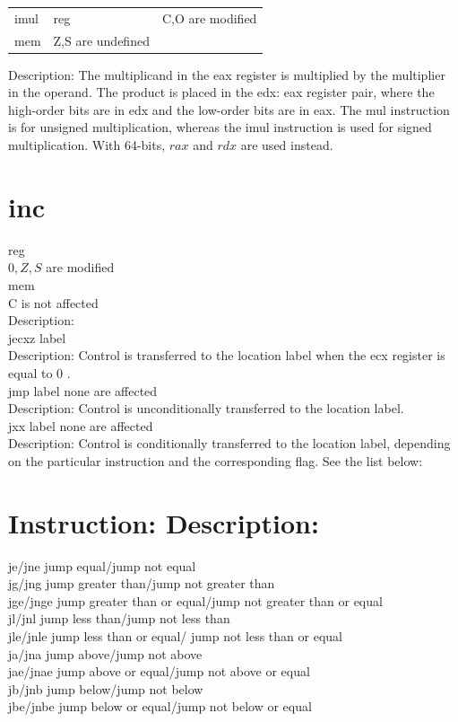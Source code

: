 \documentclass[10pt]{article}
\begin{document}
\begin{center}
\begin{tabular}{lll}
imul & reg & C,O are modified \\
mem & Z,S are undefined &  \\
\end{tabular}
\end{center}

Description: The multiplicand in the eax register is multiplied by the multiplier in the operand. The product is placed in the edx: eax register pair, where the high-order bits are in edx and the low-order bits are in eax. The mul instruction is for unsigned multiplication, whereas the imul instruction is used for signed multiplication. With 64-bits, $r a x$ and $r d x$ are used instead.

\section*{inc}
reg\\
$0, Z, S$ are modified\\
mem\\
C is not affected\\
Description:\\
jecxz label\\
Description: Control is transferred to the location label when the ecx register is equal to 0 .\\
jmp label none are affected\\
Description: Control is unconditionally transferred to the location label.\\
jxx label none are affected\\
Description: Control is conditionally transferred to the location label, depending on the particular instruction and the corresponding flag. See the list below:

\section*{Instruction: Description:}
je/jne jump equal/jump not equal\\
jg/jng jump greater than/jump not greater than\\
jge/jnge jump greater than or equal/jump not greater than or equal\\
jl/jnl jump less than/jump not less than\\
jle/jnle jump less than or equal/ jump not less than or equal\\
ja/jna jump above/jump not above\\
jae/jnae jump above or equal/jump not above or equal\\
jb/jnb jump below/jump not below\\
jbe/jnbe jump below or equal/jump not below or equal
\end{document}
